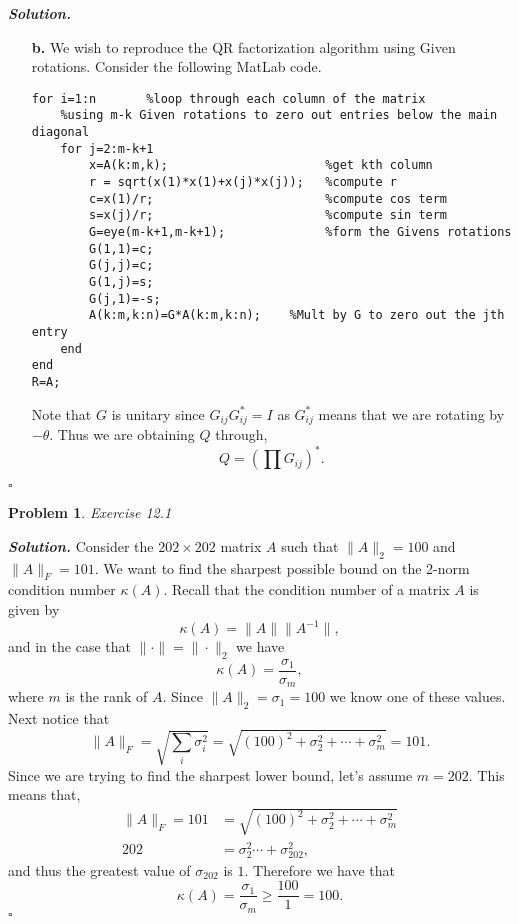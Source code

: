 \documentclass[12pt]{report}
\newtheorem{problem}{Problem}
\newenvironment{solution}[1][\it{Solution}]{\textbf{#1. } }{$\square$}
\newcommand{\paren}[1]{{\left(#1\right)}} %
\begin{document}
\begin{solution}
\begin{enumerate}
        \item [{\bf b.}]
        We wish to reproduce the QR factorization algorithm using Given rotations. Consider the following MatLab code.
        \begin{verbatim}
for i=1:n       %loop through each column of the matrix
    %using m-k Given rotations to zero out entries below the main diagonal    
    for j=2:m-k+1 
        x=A(k:m,k);                      %get kth column
        r = sqrt(x(1)*x(1)+x(j)*x(j));   %compute r
        c=x(1)/r;                        %compute cos term
        s=x(j)/r;                        %compute sin term
        G=eye(m-k+1,m-k+1);              %form the Givens rotations
        G(1,1)=c;
        G(j,j)=c;
        G(1,j)=s;
        G(j,1)=-s;
        A(k:m,k:n)=G*A(k:m,k:n);    %Mult by G to zero out the jth entry 
    end
end
R=A;
        \end{verbatim}
        Note that $G$ is unitary since $G_{ij}G^*_{ij} = I$ as $G^*_{ij}$ means that we are rotating by $-\theta$. Thus we are obtaining $Q$ through,
        \[ Q = \paren{\prod G_{ij}}^*.\]

    \end{enumerate} 
\end{solution}

\newpage



\begin{problem}
    Exercise 12.1
\end{problem}

\begin{solution}
    \noindent
    Consider the $202 \times 202$ matrix $A$ such that $\|A\|_2 = 100$ and $\|A\|_F = 101$. We want to find the sharpest possible bound on the 2-norm condition number $\kappa(A)$. Recall that the condition number of a matrix $A$ is given by
    \[ 
        \kappa(A) = \|A\|\|A^{-1}\|,
    \]
    and in the case that $\| \cdot \| = \| \cdot \|_2$ we have
    \[ 
        \kappa(A) = \frac{\sigma_1}{\sigma_m},
    \]
    where $m$ is the rank of $A$. Since $\|A\|_2 = \sigma_1 = 100$ we know one of these values. Next notice that
    \[
        \|A\|_F = \sqrt{\sum_i \sigma_i^2} = \sqrt{(100)^2 + \sigma_2^2 + \cdots + \sigma_m^2} = 101.
    \]
    Since we are trying to find the sharpest lower bound, let's assume $m = 202$. This means that,
    \begin{align*}
        \|A\|_F = 101 &= \sqrt{(100)^2 + \sigma_2^2 + \cdots + \sigma_m^2}\\
        202 &= \sigma_2^2 \cdots + \sigma_{202}^2,
    \end{align*}
    and thus the greatest value of $\sigma_{202}$ is $1$. Therefore we have that
    \[
        \kappa(A) = \frac{\sigma_1}{\sigma_m} \geq \frac{100}{1} = 100.
    \]
\end{solution}
\end{document}
